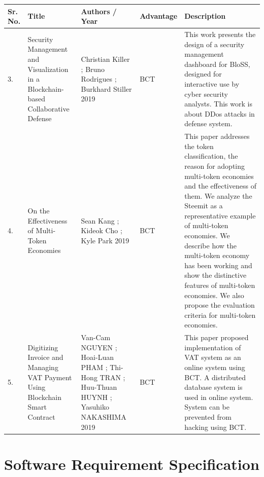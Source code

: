 \documentclass[oneside,a4paper,12pt]{report}
\begin{document}
\newpage
\begin{table}[!htbp]
\begin{center}
\def\arraystretch{1.5}
\begin{tabular}{| p{0.5cm} | p{2cm} |p{2cm}| p{2cm} | p{5.5cm} |} \hline
\textbf{Sr. No.} & \textbf{Title} & \textbf{Authors / Year}& \textbf{Advantage} & \textbf{Description} \\ \hline

3. & Security Management and Visualization in a Blockchain-based Collaborative Defense
   & Christian Killer ; Bruno Rodrigues ; Burkhard Stiller 2019


   & BCT
   & This work presents the design of a security management dashboard for BloSS, designed for interactive use by cyber security analysts. This work is about DDos attacks in defense system. \\ \hline

4. & On the Effectiveness of Multi-Token Economies


   & Sean Kang ; Kideok Cho ; Kyle Park 2019
   & BCT
   & This paper addresses the token classification, the reason for adopting multi-token economies and the effectiveness of them. We analyze the Steemit as a representative example of multi-token economies. We describe how the multi-token economy has been working and show the distinctive features of multi-token economies. We also propose the evaluation criteria for multi-token economies. \\ \hline

5. & Digitizing Invoice and Managing VAT Payment Using Blockchain Smart Contract



   & Van-Cam NGUYEN ; Hoai-Luan PHAM ; Thi-Hong TRAN ; Huu-Thuan HUYNH ; Yasuhiko NAKASHIMA 2019


   & BCT
   & This paper proposed implementation of VAT system as an online system using BCT. A distributed database system is used in online system. System can be prevented from hacking using BCT. \\ \hline

\end{tabular}
\end{center}
\end{table}

\chapter{Software Requirement Specification}
\end{document}

